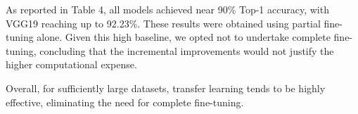 As reported in Table 4, all models achieved near 90\% Top-1 accuracy, with VGG19 reaching up to 92.23\%. These results were obtained using partial fine-tuning alone. Given this high baseline, we opted not to undertake complete fine-tuning, concluding that the incremental improvements would not justify the higher computational expense. 

Overall, for sufficiently large datasets, transfer learning tends to be highly effective, eliminating the need for complete fine-tuning.
